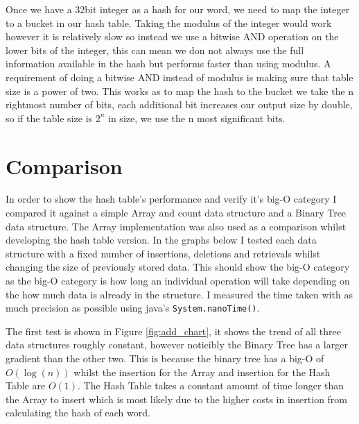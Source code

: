 \documentclass[12pt]{article}
\begin{document}
Once we have a 32bit integer as a hash for our word, we need to map the integer to a bucket in our hash table. Taking the modulus of the integer would work however it is relatively slow so instead we use a bitwise AND operation on the lower bits of the integer, this can mean we don not always use the full information available in the hash but performs faster than using modulus. A requirement of doing a bitwise AND instead of modulus is making sure that table size is a power of two. This works as to map the hash to the bucket we take the n rightmost number of bits, each additional bit increases our output size by double, so if the table size is $2^n$ in size, we use the n most significant bits.

\section{Comparison}

In order to show the hash table's performance and verify it's big-O category I compared it against a simple Array and count data structure and a Binary Tree data structure. The Array implementation was also used as a comparison whilst developing the hash table version. In the graphs below I tested each data structure with a fixed number of insertions, deletions and retrievals whilst changing the size of previously stored data. This should show the big-O category as the big-O category is how long an individual operation will take depending on the how much data is already in the structure. I measured the time taken with as much precision as possible using java's \texttt{System.nanoTime()}.

The first test is shown in Figure \ref{fig:add_chart}, it shows the trend of all three data structures roughly constant, however noticibly the Binary Tree has a larger gradient than the other two. This is because the binary tree has a big-O of $O(\log(n))$ whilst the insertion for the Array and insertion for the Hash Table are $O(1)$. The Hash Table takes a constant amount of time longer than the Array to insert which is most likely due to the higher costs in insertion from calculating the hash of each word.
\end{document}
